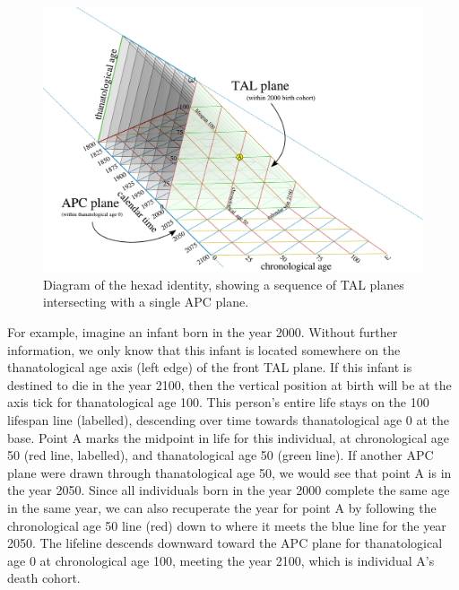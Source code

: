 \documentclass[12pt,oneside,a4paper,doublespacing]{article} %
\theoremstyle{definition}
\begin{document}
\begin{figure}[!h]
\centering
\caption[cap]{Diagram of the hexad identity, showing a sequence of TAL
planes intersecting with a single APC plane.}
\label{fig:apctTAL}
\includegraphics[scale=.5]{Figures/TALisomarkedup2.pdf}
\end{figure}

For example, imagine an infant born in the year 2000. Without further
information, we only know that this infant is located somewhere on the
thanatological age axis (left edge) of the front TAL plane. If this infant is
destined to die in the year 2100, then the vertical position at birth will be at the axis tick for thanatological age 100. This
person's entire life stays on the 100 lifespan line (labelled),
descending over time towards thanatological age 0 at the base. Point A marks the
midpoint in life for this individual, at chronological age 50 (red line, labelled), and
thanatological age 50 (green line). If another APC plane were drawn through thanatological age 50, we would see that point A is in the year 2050. Since all individuals born in the year 2000 complete the same age in the same year, we can
also recuperate the year for point A by following the chronological age 50 line
(red) down to where it meets the blue line for the year 2050. The lifeline
descends downward toward the APC plane for thanatological age 0 at chronological
age 100, meeting the year 2100, which is individual A's death cohort.
\end{document}
